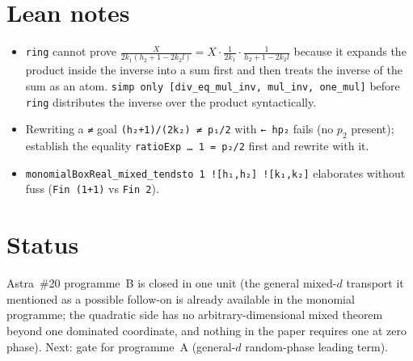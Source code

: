 \documentclass[11pt]{article}
\begin{document}
\section{Lean notes}
\begin{itemize}
\item \texttt{ring} cannot prove $\frac{X}{2k_1(h_2+1-2k_2l)}=X\cdot\frac1{2k_1}\cdot\frac1{h_2+1-2k_2l}$
  because it expands the product inside the inverse into a sum first and then treats the inverse of
  the sum as an atom. \texttt{simp only [div\_eq\_mul\_inv, mul\_inv, one\_mul]} before \texttt{ring}
  distributes the inverse over the product syntactically.
\item Rewriting a \texttt{≠} goal \texttt{(h₂+1)/(2k₂) ≠ p₁/2} with \texttt{← hp₂} fails (no $p_2$
  present); establish the equality \texttt{ratioExp … 1 = p₂/2} first and rewrite with it.
\item \texttt{monomialBoxReal\_mixed\_tendsto 1 ![h₁,h₂] ![k₁,k₂]} elaborates without fuss
  (\texttt{Fin (1+1)} vs \texttt{Fin 2}).
\end{itemize}

\section{Status}
Astra~\#20 programme~B is closed in one unit (the general mixed-$d$ transport it mentioned as a
possible follow-on is already available in the monomial programme; the quadratic side has no
arbitrary-dimensional mixed theorem beyond one dominated coordinate, and nothing in the paper
requires one at zero phase). Next: gate for programme~A (general-$d$ random-phase leading term).
\end{document}
